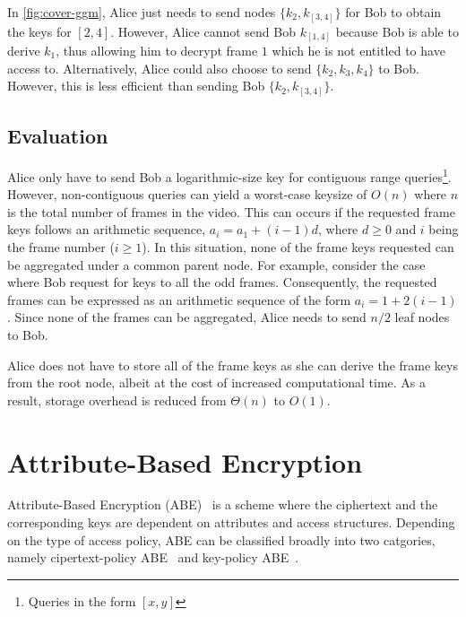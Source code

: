 \documentclass[hyp,a4paper,12pt,openbib]{socreport}
\begin{document}
In \cref{fig:cover-ggm}, Alice just needs to send nodes $\{k_2, k_{[3,4]}\}$ for Bob to obtain the keys for $[2,4]$. However, Alice cannot send Bob $k_{[1,4]}$ because Bob is able to derive $k_{1}$, thus allowing him to decrypt frame $1$ which he is not entitled to have access to. Alternatively, Alice could also choose to send $\{k_2, k_3, k_4\}$ to Bob. However, this is less efficient than sending Bob $\{k_2, k_{[3,4]}\}$.

\subsection{Evaluation}

Alice only have to send Bob a logarithmic-size key for contiguous range queries\footnote{Queries in the form $[x,y]$}.
However, non-contiguous queries can yield a worst-case keysize of $O(n)$ where $n$ is the total number of frames in the video. This can occurs if the requested frame keys follows an arithmetic sequence, $a_i = a_1 + (i-1)d$, where $d \geq 0$ and $i$ being the frame number ($i\geq 1$). In this situation, none of the frame keys requested can be aggregated under a common parent node. For example, consider the case where Bob request for keys to all the odd frames. Consequently, the requested frames can be expressed as an arithmetic sequence of the form $a_i = 1 + 2(i-1)$. Since none of the frames can be aggregated, Alice needs to send $n/2$ leaf nodes to Bob.

Alice does not have to store all of the frame keys as she can derive the frame keys from the root node, albeit at the cost of increased computational time. As a result, storage overhead is reduced from $\Theta(n)$ to $O(1)$. 

\section{Attribute-Based Encryption}
\label{sec:abe}
Attribute-Based Encryption (ABE)~\cite{bethencourt2007ciphertext,waters2011ciphertext,goyal2006attribute,sahai2005fuzzy,lewko2010revocation} is a scheme where the ciphertext and the corresponding keys are dependent on attributes and access structures. Depending on the type of access policy, ABE can be classified broadly into two catgories, namely cipertext-policy ABE~\cite{bethencourt2007ciphertext,waters2011ciphertext} and key-policy ABE~\cite{goyal2006attribute,lewko2010revocation}. 


\end{document}
